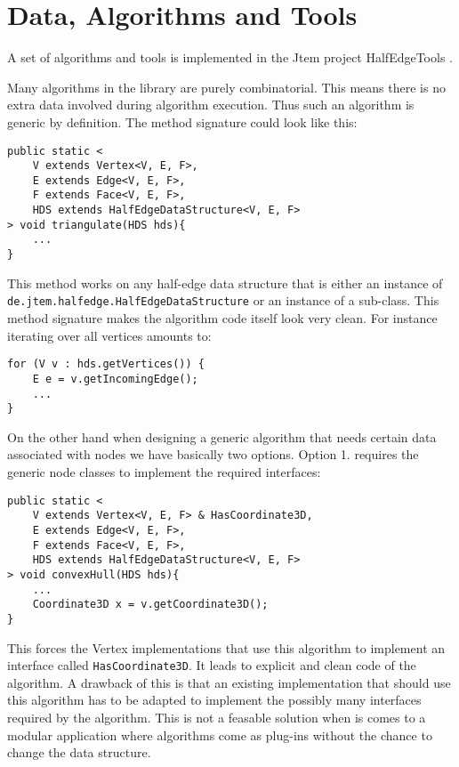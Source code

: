 \section{Data, Algorithms and Tools}

A set of algorithms and tools is implemented in the {\sc Jtem} project {\sc HalfEdgeTools}
\cite{JtemWebsite}. 

Many algorithms in the library are purely combinatorial. This means there is no extra data 
involved during algorithm execution. Thus such an algorithm is generic by definition. The
method signature could look like this:

\begin{lstlisting}
public static <
	V extends Vertex<V, E, F>,
	E extends Edge<V, E, F>,
	F extends Face<V, E, F>,
	HDS extends HalfEdgeDataStructure<V, E, F>
> void triangulate(HDS hds){
	...
}
\end{lstlisting}

This method works on any half-edge data structure that is either an instance of {\tt
de.jtem.half\-edge.HalfEdgeDataStructure} or an instance of a sub-class. This method
signature makes the algorithm code itself look very clean. For instance iterating over
all vertices amounts to:

\begin{lstlisting}
for (V v : hds.getVertices()) {
	E e = v.getIncomingEdge();
	...
}
\end{lstlisting}

On the other hand when designing a generic algorithm that needs certain data associated
with nodes we have basically two options. Option 1. requires the generic node classes to
implement the required interfaces:

\begin{lstlisting}
public static <
	V extends Vertex<V, E, F> & HasCoordinate3D,
	E extends Edge<V, E, F>,
	F extends Face<V, E, F>,
	HDS extends HalfEdgeDataStructure<V, E, F>
> void convexHull(HDS hds){
	...
	Coordinate3D x = v.getCoordinate3D();
}
\end{lstlisting}

This forces the Vertex implementations that use this algorithm to implement an interface
called {\tt HasCoordinate3D}. It leads to explicit and clean code of the algorithm. A drawback of this
is that an existing implementation that should use this algorithm has to be adapted to implement the 
possibly many interfaces required by the algorithm. 
This is not a feasable solution when is comes to a modular application where algorithms come as 
plug-ins without the chance to change the data structure.

